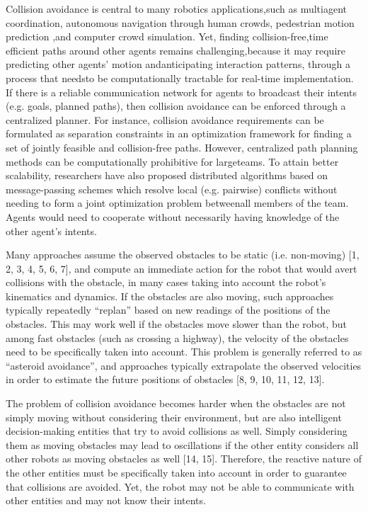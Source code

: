 \documentclass[12pt]{report}
\begin{document}
Collision avoidance is central to many robotics applications,such as multiagent coordination, autonomous navigation through human crowds, pedestrian motion prediction ,and computer crowd simulation. Yet, finding collision-free,time efficient paths around other agents remains challenging,because it may require predicting other agents’ motion andanticipating interaction patterns, through a process that needsto be computationally tractable for real-time implementation. If  there  is  a  reliable  communication network for agents to broadcast their intents (e.g.  goals,  planned  paths),  then collision avoidance can be enforced through a centralized planner. For instance, collision avoidance requirements can be formulated as separation constraints  in an optimization framework for finding a set of jointly feasible and collision-free paths. However, centralized path planning methods can be computationally prohibitive for largeteams. To attain better scalability, researchers have also proposed  distributed  algorithms  based  on  message-passing schemes which resolve local (e.g. pairwise) conflicts without needing to form a joint optimization problem betweenall members of the team. Agents would need to cooperate without necessarily having knowledge of the other agent’s intents.

 Many approaches assume the observed obstacles to be static (i.e. non-moving) [1, 2, 3, 4, 5, 6, 7], and compute an immediate action for the robot that would avert collisions with the obstacle, in many cases taking into account the robot’s kinematics and dynamics. If the obstacles are also moving, such approaches typically repeatedly “replan” based on new readings of the positions of the obstacles. This may work well if the obstacles move slower than the robot, but among fast obstacles (such as crossing a highway), the velocity of the obstacles need to be specifically taken into account. This problem is generally referred to as “asteroid avoidance”, and approaches typically extrapolate the observed velocities in order to estimate the future positions of obstacles [8, 9, 10, 11, 12, 13].
 
The problem of collision avoidance becomes harder when the obstacles are
not simply moving without considering their environment, but are also intelligent
decision-making entities that try to avoid collisions as well. Simply considering
them as moving obstacles may lead to oscillations if the other entity considers all
other robots as moving obstacles as well [14, 15]. Therefore, the reactive nature of
the other entities must be specifically taken into account in order to guarantee that
collisions are avoided. Yet, the robot may not be able to communicate with other
entities and may not know their intents. 
\end{document}

